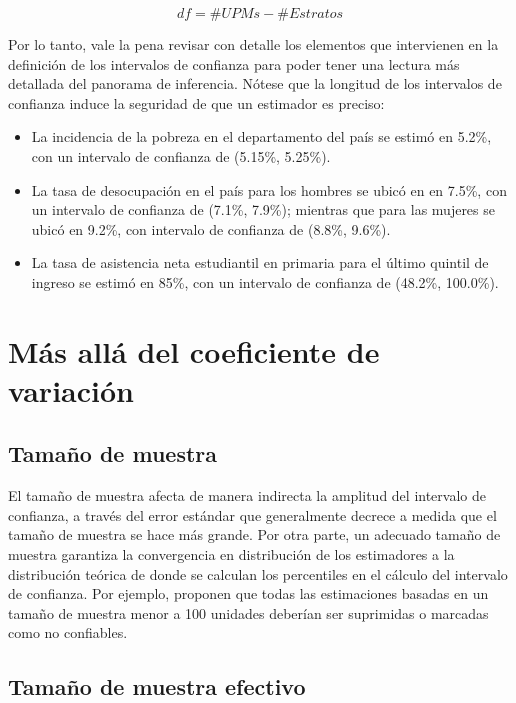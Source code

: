 \documentclass[12pt,spanish,]{book}
\providecommand{\tightlist}{%
  \setlength{\itemsep}{0pt}\setlength{\parskip}{0pt}}
\begin{document}
\[
df = \# UPMs - \# Estratos
\]

Por lo tanto, vale la pena revisar con detalle los elementos que intervienen en la definición de los intervalos de confianza para poder tener una lectura más detallada del panorama de inferencia. Nótese que la longitud de los intervalos de confianza induce la seguridad de que un estimador es preciso:

\begin{itemize}
\tightlist
\item
  La incidencia de la pobreza en el departamento del país se estimó en 5.2\%, con un intervalo de confianza de (5.15\%, 5.25\%).
\item
  La tasa de desocupación en el país para los hombres se ubicó en en 7.5\%, con un intervalo de confianza de (7.1\%, 7.9\%); mientras que para las mujeres se ubicó en 9.2\%, con intervalo de confianza de (8.8\%, 9.6\%).
\item
  La tasa de asistencia neta estudiantil en primaria para el último quintil de ingreso se estimó en 85\%, con un intervalo de confianza de (48.2\%, 100.0\%).
\end{itemize}

\hypertarget{mas-alla-del-coeficiente-de-variacion}{%
\section{Más allá del coeficiente de variación}\label{mas-alla-del-coeficiente-de-variacion}}

\hypertarget{tamano-de-muestra-1}{%
\subsection*{Tamaño de muestra}\label{tamano-de-muestra-1}}

El tamaño de muestra afecta de manera indirecta la amplitud del intervalo de confianza, a través del error estándar que generalmente decrece a medida que el tamaño de muestra se hace más grande. Por otra parte, un adecuado tamaño de muestra garantiza la convergencia en distribución de los estimadores a la distribución teórica de donde se calculan los percentiles en el cálculo del intervalo de confianza. Por ejemplo, \textcite{Barnett_Walker_Chromy_Davis_Emrich_Odom_Packer_2003} proponen que todas las estimaciones basadas en un tamaño de muestra menor a 100 unidades deberían ser suprimidas o marcadas como no confiables.

\hypertarget{tamano-de-muestra-efectivo}{%
\subsection*{Tamaño de muestra efectivo}\label{tamano-de-muestra-efectivo}}
\end{document}
